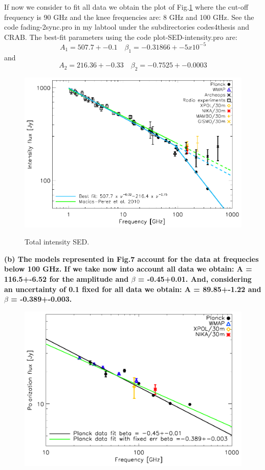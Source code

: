 \documentclass[report,onecolumn]{aa}
\begin{document}
{\color{blue} If now we consider to fit all data we obtain the plot of Fig.\ref{crab_int_SED}
where the cut-off frequency is 90 GHz and the knee frequencies are: 8 GHz and 100 GHz. See the code fading-2sync.pro in my labtool under the subdirectories codes4thesis and CRAB.
The best-fit parameters using the code plot-SED-intensity.pro are:
} 
 \begin{equation}
 A_1 = 507.7+-0.1 \quad \beta_1 = -0.31866+-5x10^{-5} \nonumber
 \end{equation}
 and
 \begin{equation}
 A_2 = 216.36+-0.33 \quad \beta_2 = -0.7525+-0.0003
 \end{equation}



\begin{figure}[!ht]
\centering
     	  { \includegraphics[width=0.5\linewidth,keepaspectratio]{referee_figures/Crab_SED_int_test.pdf}}
\caption{Total intensity SED.}     	  
 
\label{crab_int_SED}
\end{figure}


\textbf{(b) The models represented in Fig.7 account for the data at frequecies below 100 GHz. If we take now into account all data we obtain:
A = 116.5+-6.52 for the amplitude and $\beta$ = -0.45+0.01.
And, considering an uncertainty of 0.1 fixed for all data we obtain:
A = 89.85+-1.22 and $\beta$ = -0.389+-0.003.}
\begin{figure}[h!]
  \centering
     	  { \includegraphics[width=0.5\linewidth,keepaspectratio]{referee_figures/Crab_SED_ipol_test.pdf}}
     	\label{crab_polar_SED}
\end{figure}
  
\end{document}
